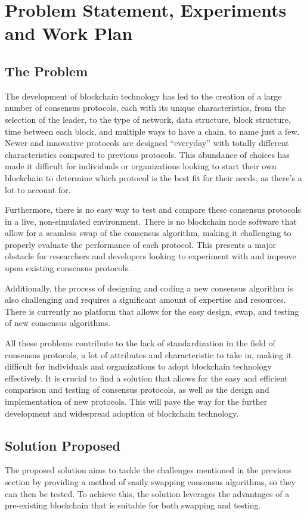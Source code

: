 \chapter{Problem Statement, Experiments and Work Plan}

\section{The Problem}
The development of blockchain technology has led to the creation of a large number of consensus protocols, each with its unique characteristics, from the selection of the leader, to the type of network, data structure, block structure, time between each block, and multiple ways to have a chain, to name just a few. Newer and innovative protocols are designed ``everyday'' with totally different characteristics compared to previous protocols.
This abundance of choices has made it difficult for individuals or organizations looking to start their own blockchain to determine which protocol is the best fit for their needs, as there's a lot to account for.

Furthermore, there is no easy way to test and compare these consensus protocols in a live, non-simulated environment.
There is no blockchain node software that allow for a seamless swap of the consensus algorithm, making it challenging to properly evaluate the performance of each protocol. This presents a major obstacle for researchers and developers looking to experiment with and improve upon existing consensus protocols.

Additionally, the process of designing and coding a new consensus algorithm is also challenging and requires a significant amount of expertise and resources. There is currently no platform that allows for the easy design, swap, and testing of new consensus algorithms.

All these problems contribute to the lack of standardization in the field of consensus protocols, a lot of attributes and characteristic to take in, making it difficult for individuals and organizations to adopt blockchain technology effectively.
It is crucial to find a solution that allows for the easy and efficient comparison and testing of consensus protocols, as well as the design and implementation of new protocols. This will pave the way for the further development and widespread adoption of blockchain technology.


\section{Solution Proposed}
The proposed solution aims to tackle the challenges mentioned in the previous section by providing a method of easily swapping consensus algorithms, so they can then be tested. To achieve this, the solution leverages the advantages of a pre-existing blockchain that is suitable for both swapping and testing.

